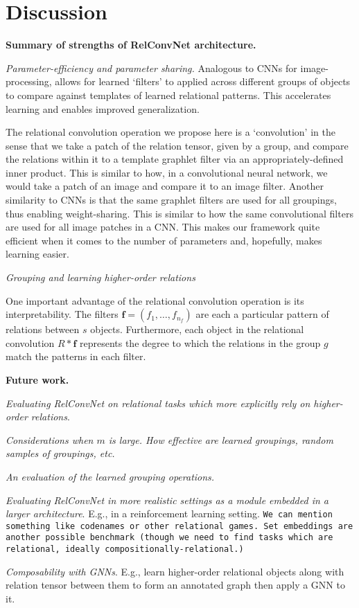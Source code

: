 
\section{Discussion}\label{sec:discussion}

\awni{[TODO]}

\textbf{Summary of strengths of RelConvNet architecture.}

\textit{Parameter-efficiency and parameter sharing.} Analogous to CNNs for image-processing, allows for learned `filters' to applied across different groups of objects to compare against templates of learned relational patterns. This accelerates learning and enables improved generalization.

The relational convolution operation we propose here is a `convolution' in the sense that we take a patch of the relation tensor, given by a group, and compare the relations within it to a template graphlet filter via an appropriately-defined inner product. This is similar to how, in a convolutional neural network, we would take a patch of an image and compare it to an image filter. Another similarity to CNNs is that the same graphlet filters are used for all groupings, thus enabling weight-sharing. This is similar to how the same convolutional filters are used for all image patches in a CNN. This makes our framework quite efficient when it comes to the number of parameters and, hopefully, makes learning easier.

\textit{Grouping and learning higher-order relations}

One important advantage of the relational convolution operation is its interpretability. The filters $\bm{f} = (f_1, \ldots, f_{n_f})$ are each a particular pattern of relations between $s$ objects. Furthermore, each object in the relational convolution $R \ast \bm{f}$ represents the degree to which the relations in the group $g$ match the patterns in each filter.


\textbf{Future work.} 

\textit{Evaluating RelConvNet on relational tasks which more explicitly rely on higher-order relations}.

\textit{Considerations when $m$ is large. How effective are learned groupings, random samples of groupings, etc.}

\textit{An evaluation of the learned grouping operations.}

\textit{Evaluating RelConvNet in more realistic settings as a module embedded in a larger architecture}. E.g., in a reinforcement learning setting. \texttt{We can mention something like codenames or other relational games. Set embeddings are another possible benchmark (though we need to find tasks which are relational, ideally compositionally-relational.)}

\textit{Composability with GNNs}. E.g., learn higher-order relational objects along with relation tensor between them to form an annotated graph then apply a GNN to it. 

